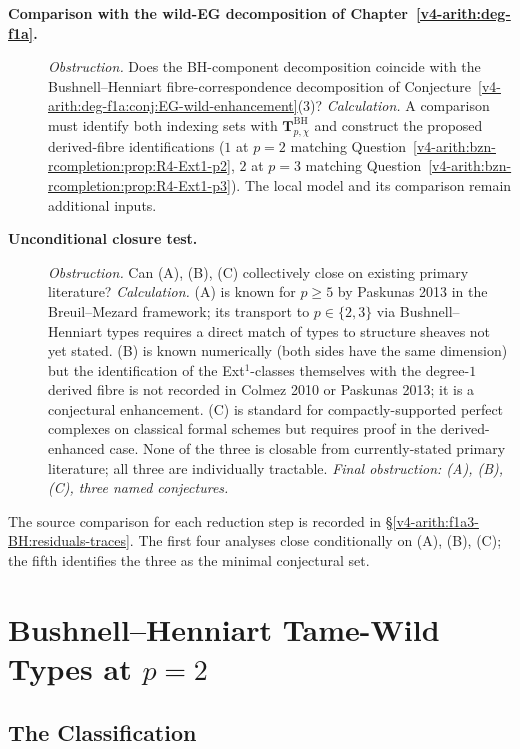 \begin{description}
\item[\textbf{Comparison with the wild-EG decomposition of Chapter~\ref{v4-arith:deg-f1a}.}] \emph{Obstruction.} Does the BH-component
decomposition coincide with the Bushnell--Henniart
fibre-correspondence decomposition of
Conjecture~\ref{v4-arith:deg-f1a:conj:EG-wild-enhancement}(3)? \emph{Calculation.}
A comparison must identify both indexing sets with
\(\mathbf T^{\mathrm{BH}}_{p,\chi}\) and construct the proposed
derived-fibre identifications
(\(1\) at \(p=2\) matching
Question~\ref{v4-arith:bzn-rcompletion:prop:R4-Ext1-p2},
\(2\) at \(p=3\) matching
Question~\ref{v4-arith:bzn-rcompletion:prop:R4-Ext1-p3}).
The local model and its comparison remain additional inputs.

\item[\textbf{Unconditional closure test.}]
\emph{Obstruction.} Can (A), (B), (C) collectively close on existing
primary literature? \emph{Calculation.} (A) is known for \(p\geq 5\) by Paskunas
2013 in the Breuil--Mezard framework; its transport to \(p\in\{2,3\}\)
via Bushnell--Henniart types requires a direct match of types to
structure sheaves not yet stated. (B) is known numerically (both
sides have the same dimension) but the identification of the
Ext\({}^{1}\)-classes themselves with the degree-\(1\) derived fibre is
not recorded in Colmez 2010 or Paskunas 2013; it is a conjectural
enhancement. (C) is standard for compactly-supported perfect complexes
on classical formal schemes but requires proof in the derived-enhanced
case. None of the three is closable from currently-stated primary
literature; all three are individually tractable.
\emph{Final obstruction: (A), (B), (C), three named conjectures.}
\end{description}

The source comparison for each reduction step is recorded in
\S\ref{v4-arith:f1a3-BH:residuals-traces}. The first four analyses
close conditionally on (A), (B), (C); the fifth identifies the three
as the minimal conjectural set.

\section{Bushnell--Henniart Tame-Wild Types at \(p=2\)}
\label{v4-arith:f1a3-BH:BH-p2}

\subsection{The Classification}

